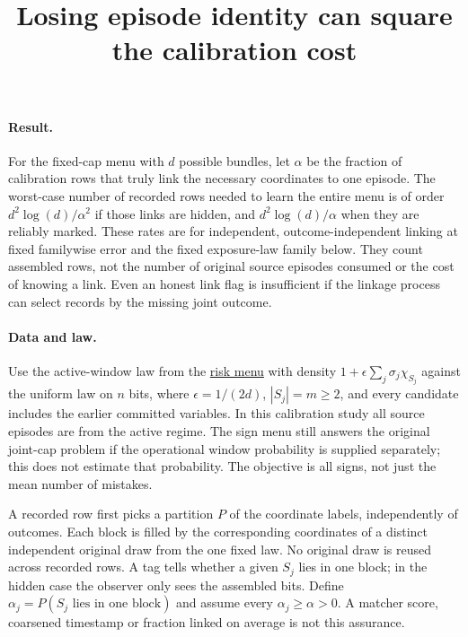 \documentclass{article}
\title{Losing episode identity can square the calibration cost}
\begin{document}
\maketitle

\paragraph{Result.}
For the fixed-cap menu with \(d\) possible bundles, let \(\alpha\)
be the fraction of calibration rows that truly link the necessary
coordinates to one episode. The worst-case number of recorded
rows needed to learn the entire menu is of order
\(d^2\log(d)/\alpha^2\) if those links are hidden, and
\(d^2\log(d)/\alpha\) when they are reliably marked. These rates
are for independent, outcome-independent linking at fixed
familywise error and the fixed exposure-law family below.
They count assembled rows, not the number of original
source episodes consumed or the cost of knowing a link.
Even an honest link flag is insufficient if the linkage process
can select records by the missing joint outcome.

\paragraph{Data and law.}
Use the active-window law from the
\href{../Risk_Bits_Before_The_Query.tex}{risk menu}
with density \(1+\epsilon\sum_j\sigma_j\chi_{S_j}\)
against the uniform law on \(n\) bits, where
\(\epsilon=1/(2d)\), \(|S_j|=m\ge2\), and every candidate
includes the earlier committed variables. In this calibration
study all source episodes are from the active regime.
The sign menu still answers the original joint-cap problem
if the operational window probability is supplied separately;
this does not estimate that probability. The objective is all
signs, not just the mean number of mistakes.

A recorded row first picks a partition \(P\) of the coordinate
labels, independently of outcomes. Each block is filled by
the corresponding coordinates of a distinct independent original
draw from the one fixed law. No original draw is reused across
recorded rows. A tag tells whether a given \(S_j\) lies in one
block; in the hidden case the observer only sees the assembled
bits. Define \(\alpha_j=P(S_j\text{ lies in one block})\) and
assume every \(\alpha_j\ge\alpha>0\). A matcher score, coarsened
timestamp or fraction linked on average is not this assurance.
\end{document}
